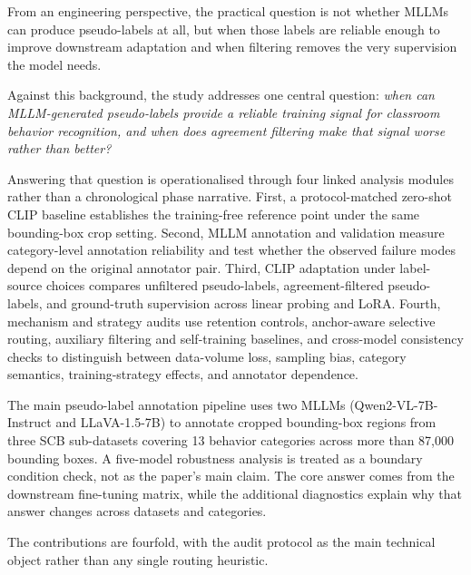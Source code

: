 \documentclass{ieeeaccess}
\begin{document}
From an engineering perspective, the practical question is not whether
MLLMs can produce pseudo-labels at all, but when those labels are
reliable enough to improve downstream adaptation and when filtering
removes the very supervision the model needs.

Against this background, the study addresses one central question:
\emph{when can MLLM-generated pseudo-labels provide a reliable training
signal for classroom behavior recognition, and when does agreement
filtering make that signal worse rather than better?}

Answering that question is operationalised through four linked analysis
modules rather than a chronological phase narrative.
First, a protocol-matched zero-shot CLIP baseline establishes the
training-free reference point under the same bounding-box crop setting.
Second, MLLM annotation and validation measure category-level
annotation reliability and test whether the observed failure modes
depend on the original annotator pair.
Third, CLIP adaptation under label-source choices compares unfiltered
pseudo-labels, agreement-filtered pseudo-labels, and ground-truth
supervision across linear probing and LoRA.
Fourth, mechanism and strategy audits use retention controls,
anchor-aware selective routing, auxiliary filtering and self-training
baselines, and cross-model consistency checks to distinguish between
data-volume loss, sampling bias, category semantics,
training-strategy effects, and annotator dependence.

The main pseudo-label annotation pipeline uses two MLLMs
(Qwen2-VL-7B-Instruct and LLaVA-1.5-7B) to annotate cropped
bounding-box regions from three SCB sub-datasets covering 13 behavior
categories across more than 87{,}000 bounding boxes.
A five-model robustness analysis is treated as a boundary
condition check, not as the paper's main claim.
The core answer comes from the downstream fine-tuning matrix,
while the additional diagnostics explain why that answer changes across
datasets and categories.

The contributions are fourfold, with the audit protocol as the main
technical object rather than any single routing heuristic.
\end{document}
